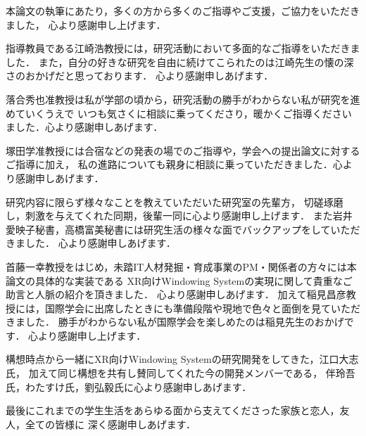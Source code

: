 本論文の執筆にあたり，多くの方から多くのご指導やご支援，ご協力をいただきました，
心より感謝申し上げます．

指導教員である江崎浩教授には，研究活動において多面的なご指導をいただきました．
また，自分の好きな研究を自由に続けてこられたのは江崎先生の懐の深さのおかげだと思っております．
心より感謝申しあげます．

落合秀也准教授は私が学部の頃から，研究活動の勝手がわからない私が研究を進めていくうえで
いつも気さくに相談に乗ってくださり，暖かくご指導くださいました．心より感謝申しあげます．

塚田学准教授には合宿などの発表の場でのご指導や，学会への提出論文に対するご指導に加え，
私の進路についても親身に相談に乗っていただきました．心より感謝申しあげます．

研究内容に限らず様々なことを教えていただいた研究室の先輩方，
切磋琢磨し，刺激を与えてくれた同期，後輩一同に心より感謝申し上げます．
また岩井愛映子秘書，高橋富美秘書には研究生活の様々な面でバックアップをしていただきました．
心より感謝申しあげます．

首藤一幸教授をはじめ，未踏IT人材発掘・育成事業のPM・関係者の方々には本論文の具体的な実装である
XR向けWindowing Systemの実現に関して貴重なご助言と人脈の紹介を頂きました．
心より感謝申しあげます．
加えて稲見昌彦教授には，国際学会に出席したときにも準備段階や現地で色々と面倒を見ていただきました．
勝手がわからない私が国際学会を楽しめたのは稲見先生のおかげです．
心より感謝申し上げます．

構想時点から一緒にXR向けWindowing Systemの研究開発をしてきた，江口大志氏，
加えて同じ構想を共有し賛同してくれた今の開発メンバーである，
伴玲吾氏，わたすけ氏，劉弘毅氏に心より感謝申しあげます．

最後にこれまでの学生生活をあらゆる面から支えてくださった家族と恋人，友人，全ての皆様に
深く感謝申しあげます．

